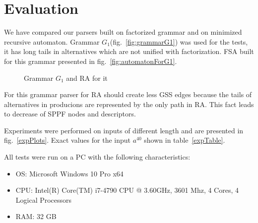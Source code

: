 \documentclass[runningheads,a4paper]{llncs}
\begin{document}
\section{Evaluation}

We have compared our parsers built on factorized grammar and on minimized recursive automaton.
Grammar $G_1$(fig.~\ref{fig:grammarG1}) was used for the tests, it has long tails in alternatives which are not unified with factorization.
FSA built for this grammar presented in fig.~\ref{fig:automatonForG1}.

\begin{figure}[ht]   
    \centering

    \caption{Grammar $G_1$ and RA for it}
\end{figure}

For this grammar parser for RA should create less GSS edges because the tails of alternatives in producions
are represented by the only path in RA. This fact leads to decrease of SPPF nodes and descriptors.

Experiments were performed on inputs of different length and are presented in fig.~\ref{expPlots}.
Exact values for the input $a^{40}$ shown in table~\ref{expTable}.

All tests were run on a PC with the following characteristics:
\begin{itemize}
    \item OS: Microsoft Windows 10 Pro x64
    \item CPU: Intel(R) Core(TM) i7-4790 CPU @ 3.60GHz, 3601 Mhz, 4 Cores, 4 Logical Processors
    \item RAM: 32 GB
\end{itemize}
\end{document}

